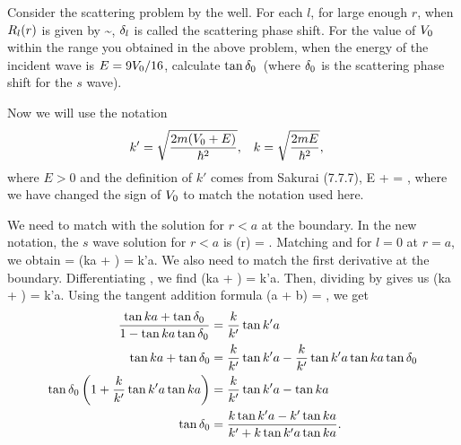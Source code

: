 \begin{problem}
	Consider the scattering problem by the well.  For each $l$, for large enough $r$, when $R_l(r)$ is given by
	\beqn \label{outside}
		\Rlr \sim \Al {},
	\eeqn
	$\delta_l$ is called the scattering phase shift.  For the value of $V_0$ within the range you obtained in the above problem, when the energy of the incident wave is $E = 9 V_0 / 16$, calculate $\tan\delta_0$~(where $\delta_0$ is the scattering phase shift for the $s$ wave).
\end{problem}

\begin{solution}
	Now we will use the notation
	\begin{align} \label{kk}
		k' &= \sqrt{\frac{2m (V_0 + E)}{\hbar^2}}, &
		k &= \sqrt{\frac{2m E}{\hbar^2}},
	\end{align}
	where $E > 0$ and the definition of $k'$ comes from Sakurai (7.7.7),
	\beq
		E + \Vo = ,
	\eeq
	where we have changed the sign of $V_0$ to match the notation used here.
	
	We need to match  with the solution for $r < a$ at the boundary.  In the new notation, the $s$ wave solution for $r < a$ is
	\beqn \label{inside}
		\Ro(r) = \Bo {}.
	\eeqn
	Matching  and  for $l = 0$ at $r = a$, we obtain
	\beqn \label{cont}
		\Ao {} = \Bo {}
		\qimplies
		\sin(ka + \delo) =  \sin k'a.
	\eeqn
	We also need to match the first derivative at the boundary.  Differentiating , we find
	\beqn \label{dcont}
		\cos(ka + \delo) =  \cos k'a.
	\eeqn
	Then, dividing  by  gives us
	\beq
		\tan(ka + \delo) =  \tan k'a.
	\eeq
	Using the tangent addition formula
	\beq
		\tan(a + b) = ,
	\eeq
	we get
	\begin{align}
		\frac{\tan ka + \tan \delta_0}{1 - \tan ka \tan \delta_0} &= \frac{k}{k'} \tan k'a \notag \\
		\tan ka + \tan \delta_0 &= \frac{k}{k'} \tan k'a - \frac{k}{k'} \tan k'a \tan ka \tan \delta_0 \notag \\
		\tan \delta_0 \left( 1 + \frac{k}{k'} \tan k'a \tan ka \right) &= \frac{k}{k'} \tan k'a - \tan ka \notag \\
		\tan \delta_0 &= \frac{k \tan k' a - k' \tan ka}{k' + k \tan k' a \tan ka}. \label{delo}
	\end{align}
	

\end{solution}
